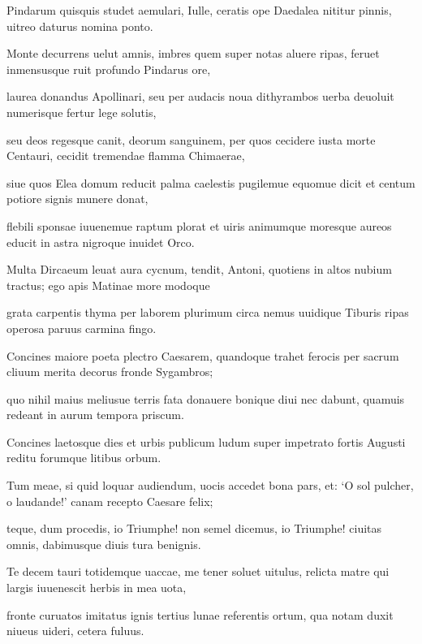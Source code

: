 \documentclass{book}
\newenvironment {carmen} [1] [\relax] 
  {\Titulus \Versus \incipit*\numerus{1}#1}
  {\endVersus}
\newcommand {\Sapphic}   {\Forma \strophae {0 \poena 00 \poena 1}}
\begin{document}
\begin{carmen}[\Sapphic]

Pindarum quisquis studet aemulari,
 Iulle, ceratis ope Daedalea
 nititur pinnis, uitreo daturus
      nomina ponto.
 
Monte decurrens uelut amnis, imbres               
 quem super notas aluere ripas,
 feruet inmensusque ruit profundo
      Pindarus ore,
 
laurea donandus Apollinari,
 seu per audacis noua dithyrambos               
 uerba deuoluit numerisque fertur
      lege solutis,
 
seu deos regesque canit, deorum
 sanguinem, per quos cecidere iusta
 morte Centauri, cecidit tremendae               
      flamma Chimaerae,
 
siue quos Elea domum reducit
 palma caelestis pugilemue equomue
 dicit et centum potiore signis
      munere donat,               
 
flebili sponsae iuuenemue raptum
 plorat et uiris animumque moresque
 aureos educit in astra nigroque
      inuidet Orco.
 
Multa Dircaeum leuat aura cycnum,               
 tendit, Antoni, quotiens in altos
 nubium tractus; ego apis Matinae
      more modoque
 
grata carpentis thyma per laborem
 plurimum circa nemus uuidique               
 Tiburis ripas operosa paruus
      carmina fingo.
 
Concines maiore poeta plectro
 Caesarem, quandoque trahet ferocis
 per sacrum cliuum merita decorus                
     fronde Sygambros;
 
quo nihil maius meliusue terris
 fata donauere bonique diui
 nec dabunt, quamuis redeant in aurum
      tempora priscum.               
 
Concines laetosque dies et urbis
 publicum ludum super impetrato
 fortis Augusti reditu forumque
      litibus orbum.
 
Tum meae, si quid loquar audiendum,                
uocis accedet bona pars, et: `O sol
 pulcher, o laudande!' canam recepto
      Caesare felix;
 
teque, dum procedis, io Triumphe!
 non semel dicemus, io Triumphe!               
 ciuitas omnis, dabimusque diuis
      tura benignis.
 
Te decem tauri totidemque uaccae,
 me tener soluet uitulus, relicta
 matre qui largis iuuenescit herbis                
     in mea uota,
 
fronte curuatos imitatus ignis
 tertius lunae referentis ortum,
 qua notam duxit niueus uideri,
      cetera fuluus.               
 

\end{carmen}
\end{document}
